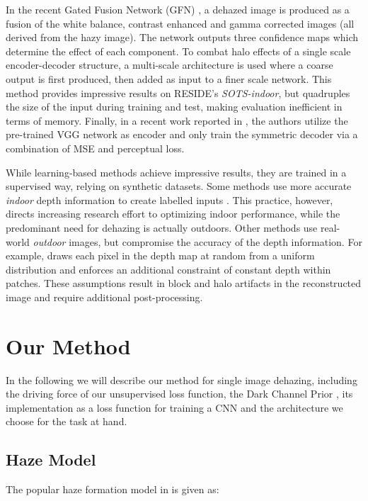 \documentclass[10pt,twocolumn,twoside]{IEEEtran}
\begin{document}
In the recent Gated Fusion Network (GFN) \cite{GFN}, a dehazed image is produced as a fusion of the white balance, contrast enhanced and gamma corrected images (all derived from the hazy image). The network outputs three confidence maps which determine the effect of each component. To combat halo effects of a single scale encoder-decoder structure, a multi-scale architecture is used where a coarse output is first produced, then added as input to a finer scale network. This method provides impressive results on RESIDE's \textit{SOTS-indoor}, but quadruples the size of the input during training and test, making evaluation inefficient in terms of memory. Finally, in a recent work reported in \cite{VGG_dehazing}, the authors utilize the pre-trained VGG \cite{VGG} network as encoder and only train the symmetric decoder via a combination of MSE and perceptual loss.

While learning-based methods achieve impressive results, they are trained in a supervised way, relying on synthetic datasets. Some methods use more accurate \textit{indoor} depth information to create labelled inputs \cite{mscnn,aodnet,GFN,VGG_dehazing}. This practice, however, directs increasing research effort to optimizing indoor performance, while the predominant need for dehazing is actually outdoors. 
Other methods use real-world \textit{outdoor} images, but compromise the accuracy of the depth information. For example, \cite{CAP} draws each pixel in the depth map at random from a  uniform distribution and \cite{dehazenet} enforces an additional constraint of constant depth within  patches. 
These assumptions result in block and halo artifacts in the reconstructed image and require additional post-processing.

\section{Our Method}\label{our_method}
In the following we will describe our method for single image dehazing, including the driving force of our unsupervised loss function, the Dark Channel Prior \cite{DCP}, its implementation as a loss function for training a CNN and the architecture we choose for the task at hand.

\subsection{Haze Model}\label{haze_formation}

The popular haze formation model in \cite{formation_model} is given as:
\end{document}

